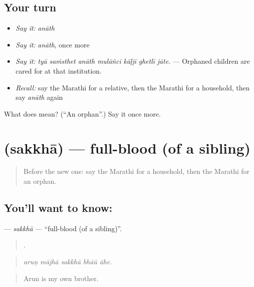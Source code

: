 \subsection*{Your turn}
\begin{itemize}
\raggedright
  \item \emph{Say it:} \emph{anāth}
  \item \emph{Say it:} \emph{anāth}, once more
  \item \emph{Say it:} \emph{tyā saṁsthet anāth mulāñcī kāḷjī ghetlī jāte.} — Orphaned children are cared for at that institution.
  \item \emph{Recall:} say the Marathi for a relative, then the Marathi for a household, then say \emph{anāth} again
\end{itemize}

\begin{tcolorbox}[breakable,colback=teal!4,colframe=teal!35!black,title={Before you move on}]
What does  mean? (\textquotedblleft{}An orphan\textquotedblright{}.) Say it once more.
\end{tcolorbox}
\section[\texorpdfstring{\mr{सख्खा} (sakkhā)}{सख्खा (sakkhā)}]{ (sakkhā) — full-blood (of a sibling)}

\label{lesson:MR-C494-sakkha}



\begin{quote}
Before the new one: say the Marathi for a household, then the Marathi for an orphan.
\end{quote}

\subsection*{You'll want to know: }
\textbf{} — \emph{sakkhā} — \textquotedblleft{}full-blood (of a sibling)\textquotedblright{}.

\begin{quote}
    .
\end{quote}

\begin{quote}
\emph{aruṇ mājhā sakkhā bhāū āhe.}
\end{quote}

\begin{quote}
Arun is my own brother.
\end{quote}

